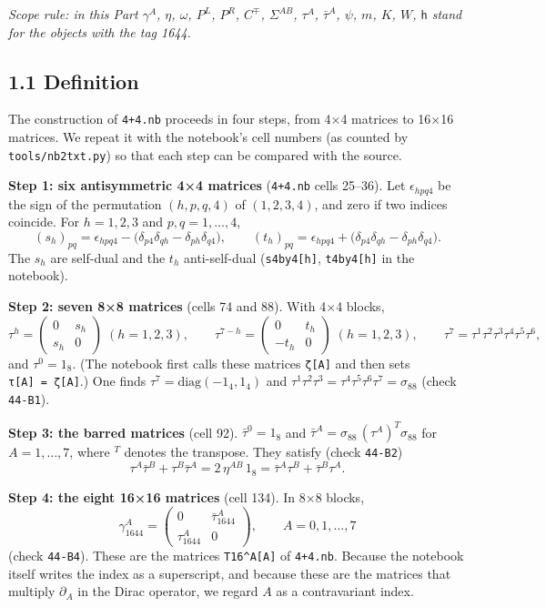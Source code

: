 \documentclass[
  10pt,
]{article}
\begin{document}
\emph{Scope rule: in this Part \(\gamma^A\), \(\eta\), \(\omega\),
\(P^{L}\), \(P^{R}\), \(C^{\mp}\), \(\Sigma^{AB}\), \(\tau^A\),
\(\bar\tau^A\), \(\psi\), \(m\), \(K\), \(W\), \(\mathsf{h}\) stand for
the objects with the tag 1644.}

\hypertarget{definition}{%
\subsection{1.1 Definition}\label{definition}}

The construction of \texttt{4+4.nb} proceeds in four steps, from 4×4
matrices to 16×16 matrices. We repeat it with the notebook's cell
numbers (as counted by \texttt{tools/nb2txt.py}) so that each step can
be compared with the source.

\textbf{Step 1: six antisymmetric 4×4 matrices} (\texttt{4+4.nb} cells
25--36). Let \(\epsilon_{hpq4}\) be the sign of the permutation
\((h,p,q,4)\) of \((1,2,3,4)\), and zero if two indices coincide. For
\(h=1,2,3\) and \(p,q=1,\dots,4\),
\[(s_h)_{pq}=\epsilon_{hpq4}-\big(\delta_{p4}\delta_{qh}-\delta_{ph}\delta_{q4}\big),\qquad
(t_h)_{pq}=\epsilon_{hpq4}+\big(\delta_{p4}\delta_{qh}-\delta_{ph}\delta_{q4}\big).\]
The \(s_h\) are self-dual and the \(t_h\) anti-self-dual
(\texttt{s4by4{[}h{]}}, \texttt{t4by4{[}h{]}} in the notebook).

\textbf{Step 2: seven 8×8 matrices} (cells 74 and 88). With 4×4 blocks,
\[\tau^h=\begin{pmatrix}0&s_h\\s_h&0\end{pmatrix}\;(h=1,2,3),\qquad
\tau^{7-h}=\begin{pmatrix}0&t_h\\-t_h&0\end{pmatrix}\;(h=1,2,3),\qquad
\tau^7=\tau^1\tau^2\tau^3\tau^4\tau^5\tau^6,\] and \(\tau^0=1_8\). (The
notebook first calls these matrices \texttt{ζ{[}A{]}} and then sets
\texttt{τ{[}A{]}\ =\ ζ{[}A{]}}.) One finds
\(\tau^7=\mathrm{diag}(-1_4,1_4)\) and
\(\tau^1\tau^2\tau^3=\tau^4\tau^5\tau^6\tau^7=\sigma_{88}\) (check
\texttt{44-B1}).

\textbf{Step 3: the barred matrices} (cell 92). \(\bar\tau^0=1_8\) and
\(\bar\tau^A=\sigma_{88}\,(\tau^A)^{T}\sigma_{88}\) for \(A=1,\dots,7\),
where \({}^T\) denotes the transpose. They satisfy (check
\texttt{44-B2})
\[\tau^A\bar\tau^B+\tau^B\bar\tau^A=2\,\eta^{AB}\,1_8=\bar\tau^A\tau^B+\bar\tau^B\tau^A .\tag{1.1}\]

\textbf{Step 4: the eight 16×16 matrices} (cell 134). In 8×8 blocks,
\[\boxed{\;\gamma_{1644}^A=\begin{pmatrix}0&\bar\tau_{1644}^A\\ \tau_{1644}^A&0\end{pmatrix},\qquad A=0,1,\dots,7\;}\tag{1.2}\]
(check \texttt{44-B4}). These are the matrices \texttt{T16\^{}A{[}A{]}}
of \texttt{4+4.nb}. Because the notebook itself writes the index as a
superscript, and because these are the matrices that multiply
\(\partial_A\) in the Dirac operator, we regard \(A\) as a contravariant
index.
\end{document}
